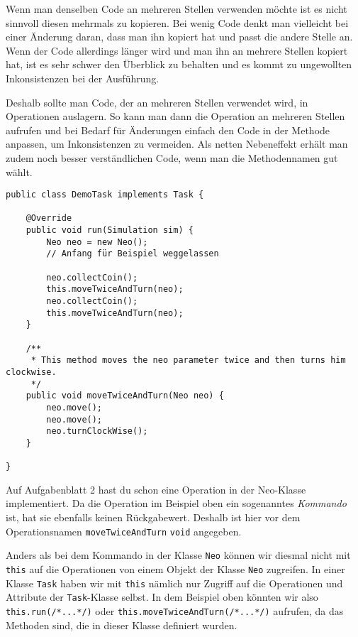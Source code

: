 \begin{Infobox}
	Wenn man denselben Code an mehreren Stellen verwenden möchte ist es nicht sinnvoll diesen mehrmals zu kopieren.
Bei wenig Code denkt man vielleicht bei einer Änderung daran, dass man ihn kopiert hat und passt die andere Stelle an.
Wenn der Code allerdings länger wird und man ihn an mehrere Stellen kopiert hat, ist es sehr schwer den Überblick zu behalten und es kommt zu ungewollten Inkonsistenzen bei der Ausführung.\newline

Deshalb sollte man Code, der an mehreren Stellen verwendet wird, in Operationen auslagern.
So kann man dann die Operation an mehreren Stellen aufrufen und bei Bedarf für Änderungen einfach den Code in der Methode anpassen, um Inkonsistenzen zu vermeiden.
Als netten Nebeneffekt erhält man zudem noch besser verständlichen Code, wenn man die Methodennamen gut wählt.

	\begin{lstlisting}[xleftmargin=0.5cm]
public class DemoTask implements Task {

    @Override
    public void run(Simulation sim) {
        Neo neo = new Neo();
        // Anfang für Beispiel weggelassen

        neo.collectCoin();
        this.moveTwiceAndTurn(neo);
        neo.collectCoin();
        this.moveTwiceAndTurn(neo);
    }

    /**
	 * This method moves the neo parameter twice and then turns him clockwise.
	 */
    public void moveTwiceAndTurn(Neo neo) {
        neo.move();
        neo.move();
        neo.turnClockWise();
    }

}
	\end{lstlisting}

	Auf Aufgabenblatt 2 hast du schon eine Operation in der Neo-Klasse implementiert.
Da die Operation im Beispiel oben ein sogenanntes \textit{Kommando} ist, hat sie ebenfalls keinen Rückgabewert.
Deshalb ist hier vor dem Operationsnamen \lstinline{moveTwiceAndTurn} \lstinline{void} angegeben.\newline

Anders als bei dem Kommando in der Klasse \lstinline{Neo} können wir diesmal nicht mit \lstinline{this} auf die Operationen von einem Objekt der Klasse \lstinline{Neo} zugreifen.
In einer Klasse \lstinline{Task} haben wir mit \lstinline{this} nämlich nur Zugriff auf die Operationen und Attribute der \lstinline{Task}-Klasse selbst.
In dem Beispiel oben könnten wir also \lstinline{this.run(/*...*/)} oder \lstinline{this.moveTwiceAndTurn(/*...*/)} aufrufen, da das Methoden sind, die in dieser Klasse definiert wurden.\newline


\end{Infobox}
